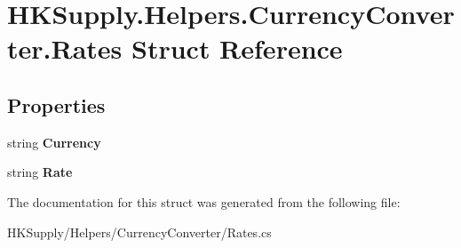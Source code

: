\hypertarget{struct_h_k_supply_1_1_helpers_1_1_currency_converter_1_1_rates}{}\section{H\+K\+Supply.\+Helpers.\+Currency\+Converter.\+Rates Struct Reference}
\label{struct_h_k_supply_1_1_helpers_1_1_currency_converter_1_1_rates}
\subsection*{Properties}
\begin{DoxyCompactItemize}
\item 
\mbox{\label{struct_h_k_supply_1_1_helpers_1_1_currency_converter_1_1_rates_a41164665ca7f7de2a534c6db1234c7b9}} 
string {\bfseries Currency}
\item 
\mbox{\label{struct_h_k_supply_1_1_helpers_1_1_currency_converter_1_1_rates_ac93579ebeab8f4bb46d7a5e2fe3c066b}} 
string {\bfseries Rate}
\end{DoxyCompactItemize}


The documentation for this struct was generated from the following file\+:\begin{DoxyCompactItemize}
\item 
H\+K\+Supply/\+Helpers/\+Currency\+Converter/Rates.\+cs\end{DoxyCompactItemize}
